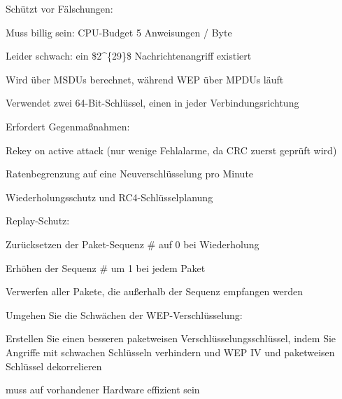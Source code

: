 \documentclass[a4paper]{article}
\begin{document}
\begin{multicols}{3}
      \begin{itemize*}
            \item
            Schützt vor Fälschungen:

            \begin{itemize*}
                  \item Muss billig sein: CPU-Budget 5 Anweisungen / Byte
                  \item Leider schwach: ein \$2\^{}\{29\}\$ Nachrichtenangriff existiert
                  \item Wird über MSDUs berechnet, während WEP über MPDUs läuft
                  \item Verwendet zwei 64-Bit-Schlüssel, einen in jeder Verbindungsrichtung
                  \item Erfordert Gegenmaßnahmen:
                  \begin{itemize*} \item Rekey on active attack (nur wenige Fehlalarme, da CRC zuerst geprüft wird) \item Ratenbegrenzung auf eine Neuverschlüsselung pro Minute \end{itemize*}
            \end{itemize*}
      \end{itemize*}

      Wiederholungsschutz und RC4-Schlüsselplanung

      \begin{itemize*}
            \item
            Replay-Schutz:

            \begin{itemize*}
                  \item Zurücksetzen der Paket-Sequenz \# auf 0 bei Wiederholung
                  \item Erhöhen der Sequenz \# um 1 bei jedem Paket
                  \item Verwerfen aller Pakete, die außerhalb der Sequenz empfangen werden
            \end{itemize*}
            \item
            Umgehen Sie die Schwächen der WEP-Verschlüsselung:

            \begin{itemize*}
                  \item Erstellen Sie einen besseren paketweisen Verschlüsselungsschlüssel, indem Sie Angriffe mit schwachen Schlüsseln verhindern und WEP IV und paketweisen Schlüssel dekorrelieren
                  \item muss auf vorhandener Hardware effizient sein
            \end{itemize*}
      \end{itemize*}


\end{multicols}
\end{document}
